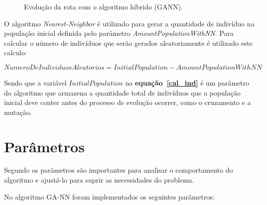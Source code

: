 \documentclass[12pt,openright,a4paper,oneside]{tcc}
\begin{document}
		\begin{figure}[h]
			\centering
            \caption{Evolução da rota com o algoritmo híbrido (GANN).}
			
			\label{figagnn}
		\end{figure}


		O algoritmo \textit{Nearest-Neighbor} é utilizado para gerar a quantidade de indivíduo na população inicial definida pelo parâmetro \textit{AmountPopulationWithNN}. Para calcular o número de indivíduos que serão gerados aleatoriamente é utilizado este calculo:

			\begin{equation}
				\label{cal_ind}
		 		NumeroDeIndividuosAleatorios = InitialPopulation - AmountPopulationWithNN 
		 	\end{equation} 
		
		Sendo que a variável $InitialPopulation$ na \textbf{equação~\ref{cal_ind}} é um parâmetro do algoritmo que armazena a quantidade total de indivíduos que a população inicial deve conter antes do processo de evolução ocorrer, como o cruzamento e a mutação.

        \section{Parâmetros}
        
        Segundo  os parâmetros são importantes para analisar o comportamento do algoritmo e ajustá-lo para suprir as necessidades do problema. 
        
        No algoritmo GA-NN foram implementados os seguintes parâmetros:
         
\end{document}
